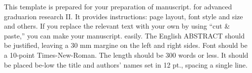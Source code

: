 This template is prepared for your preparation of manuscript.
for advanced graduarion research II.
It provides instructions: page layout, font style and size and others.
If you replace the relevant text with your own by using “cut \& paste,”
you can make your manuscript.
easily.
The English ABSTRACT should be justified,
leaving a 30 mm margine on the left and right sides.
Font should be a 10-point Times-New-Roman.
The length should be 300 words or less.
It should be placed be-low the title and authors’ names set in 12 pt.,
spacing a single line.
